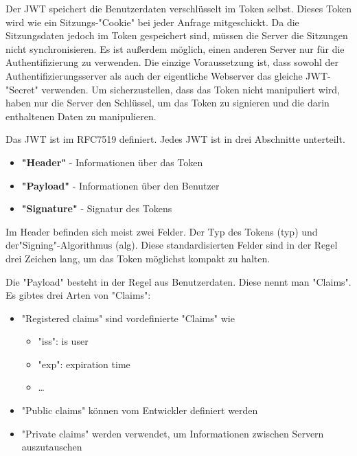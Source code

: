 \label{sec:jwt}

Der JWT speichert die Benutzerdaten verschlüsselt im Token selbst. Dieses Token wird wie ein Sitzungs-"Cookie" bei jeder Anfrage mitgeschickt. 
Da die Sitzungsdaten jedoch im Token gespeichert sind, müssen die Server die Sitzungen nicht synchronisieren. 
Es ist außerdem möglich, einen anderen Server nur für die Authentifizierung zu verwenden. 
Die einzige Voraussetzung ist, dass sowohl der Authentifizierungsserver als auch der eigentliche Webserver das gleiche JWT-"Secret" verwenden. 
Um sicherzustellen, dass das Token nicht manipuliert wird, haben nur die Server den Schlüssel, um das Token zu signieren und die darin enthaltenen Daten zu manipulieren. \cite{Auth0JWT}

Das JWT ist im RFC7519 definiert. Jedes JWT ist in drei Abschnitte\cite{Auth0JWT} unterteilt. 

\begin{itemize}
    \item \textbf{"Header"} - Informationen über das Token
    \item \textbf{"Payload"} - Informationen über den Benutzer
    \item \textbf{"Signature"} - Signatur des Tokens
\end{itemize}

Im Header befinden sich meist zwei Felder. 
Der Typ des Tokens ({\ttfamily typ}) und der\linebreak"Signing"-Algorithmus ({\ttfamily alg}). 
Diese standardisierten Felder sind in der Regel drei Zeichen lang, um das Token möglichst kompakt zu halten. \cite{Auth0JWT}

Die "Payload" besteht in der Regel aus Benutzerdaten. Diese nennt man "Claims". Es gibtes drei Arten von "Claims"\cite{Auth0JWT}: 

\begin{itemize}
    \item "Registered claims" sind vordefinierte "Claims" wie
    \begin{itemize}
        \item "iss": is user
        \item "exp":  expiration time
        \item …
    \end{itemize}
    \item "Public claims" können vom Entwickler definiert werden
    \item "Private claims" werden verwendet, um Informationen zwischen Servern auszutauschen
\end{itemize}

